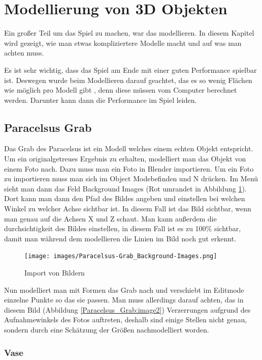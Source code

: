 \section{Modellierung von 3D Objekten}
Ein großer Teil um das Spiel zu machen, war das modellieren. In diesem Kapitel wird gezeigt, wie man etwas kompliziertere
Modelle macht und auf was man achten muss.

Es ist sehr wichtig, dass das Spiel am Ende mit einer guten Performance spielbar ist. Deswegen wurde beim Modellieren darauf geachtet,
das es so wenig Flächen wie möglich pro Modell gibt \citep{unreal:modellierungVon3dObjekten_performance}, denn diese müssen vom Computer berechnet werden.
Darunter kann dann die Performance im Spiel leiden.

\label{sec:Modellierung_von_3D_Objekten}
\subsection{Paracelsus Grab}
Das Grab des Paracelsus ist ein Modell welches einem echten Objekt entspricht. Um ein originalgetreues Ergebnis zu erhalten,
modelliert man das Objekt von einem Foto nach. Dazu muss man ein Foto in Blender importieren. Um ein Foto zu importieren muss man sich im \dq Object Mode\dq befinden und \dq N\dq
drücken. Im Menü sieht man dann das Feld Background Images (Rot umrandet in Abbildung \ref{Paracelsus_Grab:image1}). Dort kann man dann den Pfad des Bildes angeben
und einstellen bei welchen Winkel zu welcher Achse sichtbar ist. In diesem Fall ist das Bild sichtbar, wenn man genau auf die Achsen X und Z schaut. Man kann außerdem die
durchsichtigkeit des Bildes einstellen, in diesem Fall ist es zu 100\% sichtbar, damit man während dem modellieren die Linien im Bild noch gut erkennt.

\begin{figure}[h]
    \centering
    \texttt{[image: images/Paracelsus-Grab\_Background-Images.png]}
    \caption{Import von Bildern}
    \label{Paracelsus_Grab:image1}
\end{figure}

Nun modelliert man mit Formen das Grab nach und verschiebt im Editmode einzelne Punkte so das sie passen. Man muss allerdings darauf achten, das in diesem Bild
(Abbildung \ref{Paracelsus_Grab:image2}) Verzerrungen aufgrund des Aufnahmewinkels des Fotos auftreten, deshalb sind einige Stellen nicht genau, sondern
durch eine Schätzung der Größen nachmodelliert worden.

\subsubsection{Vase}


